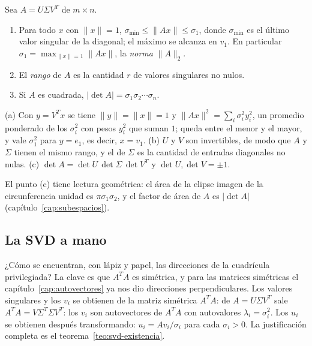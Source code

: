 \begin{proposicion}\label{prop:svd-mide}
Sea \(A=U\Sigma V^T\) de \(m\times n\).
\begin{enumerate}[label=(\alph*)]
  \item Para todo \(x\) con \(\|x\|=1\), \(\sigma_{\min}\le\|Ax\|\le\sigma_1\), donde
  \(\sigma_{\min}\) es el último valor singular de la diagonal; el máximo se alcanza en
  \(v_1\). En particular \(\sigma_1=\max_{\|x\|=1}\|Ax\|\), la \emph{norma} \(\|A\|_2\).
  \item El \emph{rango} de \(A\) es la cantidad \(r\) de valores singulares no nulos.
  \item Si \(A\) es cuadrada, \(|\det A|=\sigma_1\sigma_2\cdots\sigma_n\).
\end{enumerate}
\end{proposicion}

\begin{demostracion}
(a) Con \(y=V^Tx\) se tiene \(\|y\|=\|x\|=1\) y \(\|Ax\|^2=\sum_i\sigma_i^2y_i^2\), un
promedio ponderado de los \(\sigma_i^2\) con pesos \(y_i^2\) que suman \(1\); queda entre el
menor y el mayor, y vale \(\sigma_1^2\) para \(y=e_1\), es decir, \(x=v_1\). (b) \(U\) y
\(V\) son invertibles, de modo que \(A\) y \(\Sigma\) tienen el mismo rango, y el de
\(\Sigma\) es la cantidad de entradas diagonales no nulas. (c)
\(\det A=\det U\,\det\Sigma\,\det V^T\) y \(\det U,\det V=\pm1\).
\end{demostracion}

El punto (c) tiene lectura geométrica: el área de la elipse imagen de la circunferencia
unidad es \(\pi\sigma_1\sigma_2\), y el factor de área de \(A\) es \(|\det A|\)
(capítulo~\ref{cap:subespacios}).

\subsection{La SVD a mano}

¿Cómo se encuentran, con lápiz y papel, las direcciones de la cuadrícula privilegiada? La
clave es que \(A^TA\) es simétrica, y para las matrices simétricas el
capítulo~\ref{cap:autovectores} ya nos dio direcciones perpendiculares. Los valores singulares y los \(v_i\) se obtienen de la matriz simétrica \(A^TA\): de
\(A=U\Sigma V^T\) sale \(A^TA=V\Sigma^T\Sigma V^T\): los \(v_i\) son autovectores
de \(A^TA\) con autovalores \(\lambda_i=\sigma_i^2\). Los \(u_i\) se obtienen después
transformando: \(u_i=Av_i/\sigma_i\) para cada \(\sigma_i>0\). La justificación completa es
el teorema~\ref{teo:svd-existencia}.

